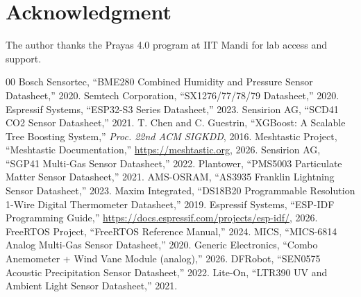 \documentclass[conference]{IEEEtran}
\begin{document}
\section*{Acknowledgment}
The author thanks the Prayas 4.0 program at IIT Mandi for lab access and
support.

\begin{thebibliography}{00}
 Bosch Sensortec, ``BME280 Combined Humidity and Pressure Sensor Datasheet,'' 2020.
 Semtech Corporation, ``SX1276/77/78/79 Datasheet,'' 2020.
 Espressif Systems, ``ESP32-S3 Series Datasheet,'' 2023.
 Sensirion AG, ``SCD41 CO2 Sensor Datasheet,'' 2021.
 T. Chen and C. Guestrin, ``XGBoost: A Scalable Tree Boosting System,'' \textit{Proc. 22nd ACM SIGKDD}, 2016.
 Meshtastic Project, ``Meshtastic Documentation,'' \url{https://meshtastic.org}, 2026.
 Sensirion AG, ``SGP41 Multi-Gas Sensor Datasheet,'' 2022.
 Plantower, ``PMS5003 Particulate Matter Sensor Datasheet,'' 2021.
 AMS-OSRAM, ``AS3935 Franklin Lightning Sensor Datasheet,'' 2023.
 Maxim Integrated, ``DS18B20 Programmable Resolution 1-Wire Digital Thermometer Datasheet,'' 2019.
 Espressif Systems, ``ESP-IDF Programming Guide,'' \url{https://docs.espressif.com/projects/esp-idf/}, 2026.
 FreeRTOS Project, ``FreeRTOS Reference Manual,'' 2024.
 MICS, ``MICS-6814 Analog Multi-Gas Sensor Datasheet,'' 2020.
 Generic Electronics, ``Combo Anemometer + Wind Vane Module (analog),'' 2026.
 DFRobot, ``SEN0575 Acoustic Precipitation Sensor Datasheet,'' 2022.
 Lite-On, ``LTR390 UV and Ambient Light Sensor Datasheet,'' 2021.
\end{thebibliography}
\end{document}
